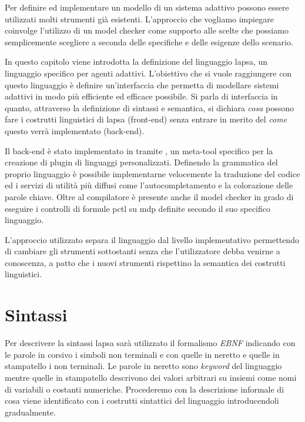 


Per definire ed implementare un modello di un sistema adattivo possono essere utilizzati molti strumenti già esistenti. L'approccio che vogliamo impiegare coinvolge l'utilizzo di un model checker come supporto alle scelte che possiamo semplicemente scegliere a seconda delle specifiche e delle esigenze dello scenario.

In questo capitolo viene introdotta la definizione del linguaggio \ac{lapsa}, un linguaggio specifico per agenti adattivi. L'obiettivo che si vuole raggiungere con questo linguaggio è definire un'interfaccia che permetta di modellare sistemi adattivi in modo più efficiente ed efficace possibile. Si parla di interfaccia in quanto, attraverso la definizione di sintassi e semantica, si dichiara \emph{cosa} possono fare i costrutti linguistici di \ac{lapsa} (front-end) senza entrare in merito del \emph{come} questo verrà implementato (back-end).

Il back-end è stato implementato in \java{} tramite \xtext{} \cite{xtext}, un meta-tool specifico per la creazione di plugin \eclipse{} di linguaggi personalizzati. Definendo la grammatica del proprio linguaggio è possibile implementarne velocemente la traduzione del codice ed i servizi di utilità più diffusi come l'autocompletamento e la colorazione delle parole chiave. Oltre al compilatore è presente anche il model checker \prism{} in grado di eseguire i controlli di formule \ac{pctl} su \ac{mdp} definite secondo il suo specifico linguaggio.

L'approccio utilizzato separa il linguaggio dal livello implementativo permettendo di cambiare gli strumenti sottostanti senza che l'utilizzatore debba venirne a conoscenza, a patto che i nuovi strumenti rispettino la semantica dei costrutti linguistici.

\section{Sintassi}
Per descrivere la sintassi \ac{lapsa} sarà utilizzato il formalismo \emph{EBNF} indicando con le parole in corsivo i simboli non terminali e con quelle in neretto e quelle in stampatello i non terminali. Le parole in neretto sono \emph{keyword} del linguaggio mentre quelle in stampatello descrivono dei valori arbitrari su insiemi come nomi di variabili o costanti numeriche. Procederemo con la descrizione informale di cosa viene identificato con i costrutti sintattici del linguaggio introducendoli gradualmente.


